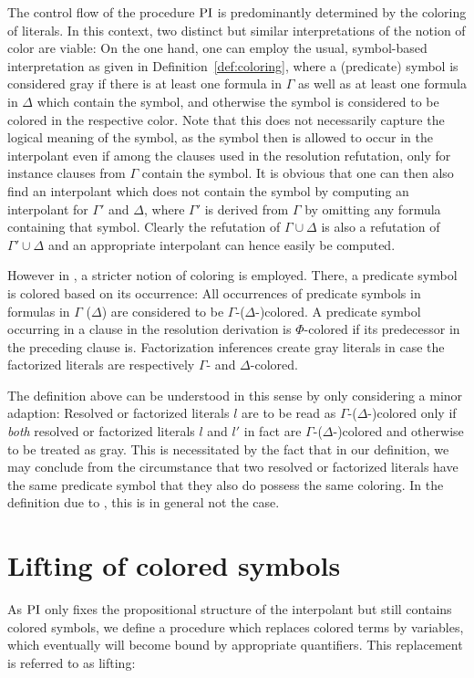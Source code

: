 \begin{remark}
	The control flow of the procedure $\operatorname{PI}$ is predominantly determined by the coloring of literals.
	In this context, two distinct but similar interpretations of the notion of color are viable: 
	On the one hand, one can employ the usual, symbol-based interpretation as given in Definition~\ref{def:coloring}, where a (predicate) symbol is considered gray if there is at least one formula in $\Gamma$ as well as at least one formula in $\Delta$ which contain the symbol, and otherwise the symbol is considered to be colored in the respective color. 
	Note that this does not necessarily capture the logical meaning of the symbol, as the symbol then is allowed to occur in the interpolant even if among the clauses used in the resolution refutation, only for instance clauses from $\Gamma$ contain the symbol.
	It is obvious that one can then also find an interpolant which does not contain the symbol by computing an interpolant for $\Gamma'$ and $\Delta$, where $\Gamma'$ is derived from $\Gamma$ by omitting any formula containing that symbol. 
	Clearly the refutation of $\Gamma \cup \Delta$ is also a refutation of $\Gamma' \cup \Delta$ and an appropriate interpolant can hence easily be computed.

	However in \cite{Huang95}, a stricter notion of coloring is employed.
	There, a predicate symbol is colored based on its occurrence:
	All occurrences of predicate symbols in formulas in $\Gamma$ ($\Delta$) are considered to be $\Gamma$-($\Delta$-)colored.
	A predicate symbol occurring in a clause in the resolution derivation is $\Phi$-colored if its predecessor in the preceding clause is.
	Factorization inferences create gray literals in case the factorized literals are respectively $\Gamma$- and $\Delta$-colored.

	The definition above can be understood in this sense by only considering a minor adaption:
	Resolved or factorized literals $l$ are to be read as $\Gamma$-($\Delta$-)colored only if \emph{both} resolved or factorized literals $l$ and $l'$ in fact are $\Gamma$-($\Delta$-)colored and otherwise to be treated as gray. 
	This is necessitated by the fact that in our definition, we may conclude from the circumstance that two resolved or factorized literals have the same predicate symbol that they also do possess the same coloring.
	In the definition due to \cite{Huang95}, this is in general not the case.
\end{remark}


\section{Lifting of colored symbols}
\label{sec:lifting}
As $\operatorname{PI}$ only fixes the propositional structure of the interpolant but still contains colored symbols, 
we define a procedure which replaces colored terms by variables, which eventually will become bound by appropriate quantifiers.
This replacement is referred to as lifting:


